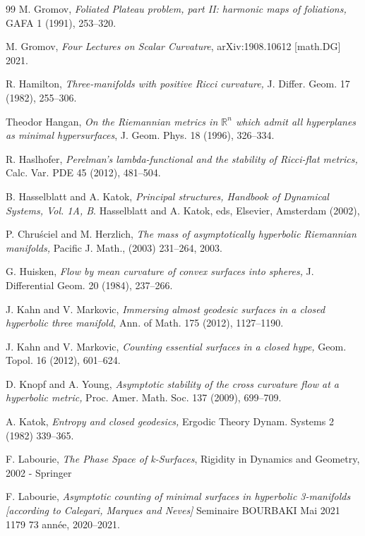 \documentclass[11pt]{amsart}
\theoremstyle{remark}
\theoremstyle{definition}
\begin{document}
{{\begin{thebibliography}{99}
		 M. Gromov, {\em Foliated Plateau problem, part II: harmonic maps of foliations,} GAFA 1
		(1991), 253--320.
		
		 M. Gromov, {\em Four Lectures on Scalar Curvature}, arXiv:1908.10612 [math.DG] 2021.
		
		 R. Hamilton, {\em Three-manifolds with positive Ricci curvature,} J. Differ. Geom. 17 (1982), 255--306. 
		
		 Theodor Hangan, \textit{On the Riemannian metrics in $\mathbb{R}^n$ which admit all hyperplanes as minimal hypersurfaces}, J. Geom. Phys. 18 (1996), 326--334. 
		
		 R. Haslhofer, {\em Perelman's lambda-functional and the stability of Ricci-flat metrics,}
		Calc. Var. PDE 45 (2012), 481--504.
		
		 B. Hasselblatt and A. Katok, {\em Principal structures, Handbook of Dynamical Systems, Vol. 1A, B}. Hasselblatt and A. Katok, eds, Elsevier, Amsterdam (2002),
		
		P. Chru{\'s}ciel and M. Herzlich, {\em The mass of asymptotically hyperbolic {R}iemannian manifolds,}
		{Pacific J. Math.}, (2003) 231--264, 2003.
		
		 G. Huisken, {\em Flow by mean curvature of convex surfaces into spheres,}
		J. Differential Geom. 20 (1984), 237--266.
		
		 J. Kahn and V. Markovic, 
		{\em Immersing almost geodesic surfaces in a closed hyperbolic three manifold,}
		Ann. of Math.  175 (2012), 1127--1190. 
		
		
		 J. Kahn and V. Markovic, 
		{\em Counting essential surfaces in a closed hype,} Geom. Topol. 16 (2012), 601--624. 
		
		 D. Knopf and A. Young, {\em Asymptotic stability of the cross curvature flow at a hyperbolic metric,} Proc. Amer. Math.
		Soc. 137 (2009), 699--709.
		
		 A. Katok, {\em Entropy and closed geodesics,} Ergodic Theory Dynam. Systems 2 (1982) 339--365.
		
		F. Labourie, {\em The Phase Space of k-Surfaces}, Rigidity in Dynamics and Geometry, 2002 - Springer
		
		
		 F. Labourie, {\em Asymptotic counting of minimal surfaces in hyperbolic 3-manifolds [according to Calegari, Marques and Neves]} Seminaire BOURBAKI Mai 2021 1179  73 ann\'ee, 2020--2021.
		

\end{thebibliography}}}
\end{document}
